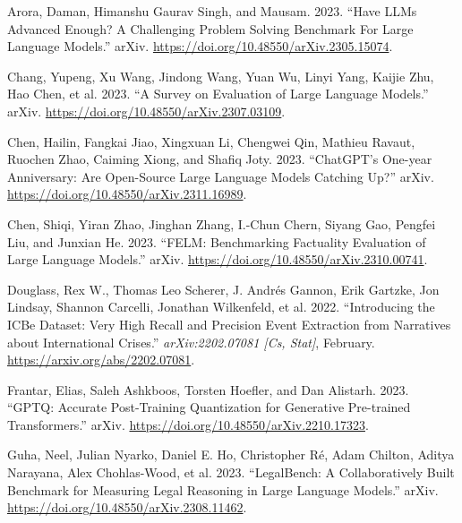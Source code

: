 \documentclass[
  letterpaper,
  DIV=11,
  numbers=noendperiod]{scrartcl}
\newlength{\cslhangindent}
\newlength{\cslentryspacingunit} %
\newenvironment{CSLReferences}[2] %
 {%
  \setlength{\parindent}{0pt}
  \ifodd #1
  \let\oldpar\par
  \def\par{\hangindent=\cslhangindent\oldpar}
  \fi
  \setlength{\parskip}{#2\cslentryspacingunit}
 }%
 {}
\begin{document}
\hypertarget{refs}{}
\begin{CSLReferences}{1}{0}
\leavevmode{}%
Arora, Daman, Himanshu Gaurav Singh, and Mausam. 2023. {``Have {LLMs
Advanced Enough}? {A Challenging Problem Solving Benchmark For Large
Language Models}.''} {arXiv}.
\url{https://doi.org/10.48550/arXiv.2305.15074}.

\leavevmode{}%
Chang, Yupeng, Xu Wang, Jindong Wang, Yuan Wu, Linyi Yang, Kaijie Zhu,
Hao Chen, et al. 2023. {``A {Survey} on {Evaluation} of {Large Language
Models}.''} {arXiv}. \url{https://doi.org/10.48550/arXiv.2307.03109}.

\leavevmode{}%
Chen, Hailin, Fangkai Jiao, Xingxuan Li, Chengwei Qin, Mathieu Ravaut,
Ruochen Zhao, Caiming Xiong, and Shafiq Joty. 2023. {``{ChatGPT}'s
{One-year Anniversary}: {Are Open-Source Large Language Models Catching}
Up?''} {arXiv}. \url{https://doi.org/10.48550/arXiv.2311.16989}.

\leavevmode{}%
Chen, Shiqi, Yiran Zhao, Jinghan Zhang, I.-Chun Chern, Siyang Gao,
Pengfei Liu, and Junxian He. 2023. {``{FELM}: {Benchmarking Factuality
Evaluation} of {Large Language Models}.''} {arXiv}.
\url{https://doi.org/10.48550/arXiv.2310.00741}.

\leavevmode{}%
Douglass, Rex W., Thomas Leo Scherer, J. Andrés Gannon, Erik Gartzke,
Jon Lindsay, Shannon Carcelli, Jonathan Wilkenfeld, et al. 2022.
{``Introducing the {ICBe Dataset}: {Very High Recall} and {Precision
Event Extraction} from {Narratives} about {International Crises}.''}
\emph{arXiv:2202.07081 {[}Cs, Stat{]}}, February.
\url{https://arxiv.org/abs/2202.07081}.

\leavevmode{}%
Frantar, Elias, Saleh Ashkboos, Torsten Hoefler, and Dan Alistarh. 2023.
{``{GPTQ}: {Accurate Post-Training Quantization} for {Generative
Pre-trained Transformers}.''} {arXiv}.
\url{https://doi.org/10.48550/arXiv.2210.17323}.

\leavevmode{}%
Guha, Neel, Julian Nyarko, Daniel E. Ho, Christopher Ré, Adam Chilton,
Aditya Narayana, Alex Chohlas-Wood, et al. 2023. {``{LegalBench}: {A
Collaboratively Built Benchmark} for {Measuring Legal Reasoning} in
{Large Language Models}.''} {arXiv}.
\url{https://doi.org/10.48550/arXiv.2308.11462}.


\end{CSLReferences}
\end{document}
